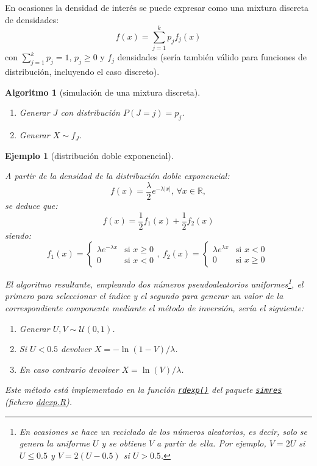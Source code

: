 \documentclass[
  10pt,
]{book}
\theoremstyle{break}
\newtheorem{conjecture}{Algoritmo}[chapter]
\newtheorem{example}{Ejemplo}[chapter]
\theoremstyle{nonumberplain}
\let\oldfootnote\footnote
\renewcommand\footnote[1]{\oldfootnote{\hspace{2mm}#1}}
\begin{document}
En ocasiones la densidad de interés se puede expresar como una mixtura discreta de densidades:
\[f(x)=\sum_{j=1}^{k}p_{j}f_{j}(x)\]
con \(\sum_{j=1}^{k}p_j=1\), \(p_j\geq 0\) y \(f_j\) densidades (sería también válido para funciones de distribución, incluyendo el caso discreto).

\begin{conjecture}[simulación de una mixtura discreta]
\protect\hypertarget{cnj:mixtura-discreta}{}\label{cnj:mixtura-discreta}

\begin{enumerate}
\def\labelenumi{\arabic{enumi}.}
\item
  Generar \(J\) con distribución \(P\left( J=j \right) = p_j\).
\item
  Generar \(X\sim f_J\).
\end{enumerate}

\end{conjecture}

\begin{example}[distribución doble exponencial]
\protect\hypertarget{exm:dexp-mix}{}\label{exm:dexp-mix}

A partir de la densidad de la distribución doble exponencial:
\[f(x) =\frac{\lambda }{2}e^{-\lambda \left\vert x\right\vert } \text{, }\forall x\in \mathbb{R},\]
se deduce que:
\[f(x) = \frac{1}{2}f_{1}(x) + \frac{1}{2}f_{2}(x)\]
siendo:
\[f_{1}(x) = \left\{ 
\begin{array}{ll}
\lambda e^{-\lambda x} & \text{si } x\geq 0 \\ 
0 & \text{si } x<0
\end{array}
\right., \  
f_{2}(x) = \left\{ 
\begin{array}{ll}
\lambda e^{\lambda x} & \text{si } x<0 \\ 
0 & \text{si } x\geq 0
\end{array}
\ \right.\]

El algoritmo resultante, empleando dos números pseudoaleatorios uniformes\footnote{En ocasiones se hace un reciclado de los números aleatorios, es decir, solo se genera la uniforme \(U\) y se obtiene \(V\) a partir de ella. Por ejemplo, \(V=2U\) si \(U \le 0.5\) y \(V=2(U-0.5)\) si \(U > 0.5\).}, el primero para seleccionar el índice y el segundo para generar un valor de la correspondiente componente mediante el método de inversión, sería el siguiente:

\begin{enumerate}
\def\labelenumi{\arabic{enumi}.}
\item
  Generar \(U,V \sim \mathcal{U}(0, 1)\).
\item
  Si \(U<0.5\) devolver \(X= -\ln( 1-V )/\lambda\).
\item
  En caso contrario devolver \(X= \ln(V)/\lambda\).
\end{enumerate}

Este método está implementado en la función \href{https://rubenfcasal.github.io/simres/reference/ddexp.html}{\texttt{rdexp()}} del paquete \href{https://rubenfcasal.github.io/simres}{\texttt{simres}} (fichero \href{R/ddexp.R}{\emph{ddexp.R}}).
\end{example}
\end{document}
